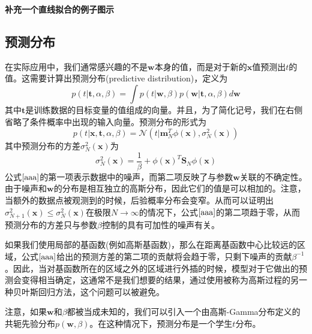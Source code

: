 \textbf{补充一个直线拟合的例子图示}
\subsection*{预测分布}
在实际应用中，我们通常感兴趣的不是$\boldsymbol{w}$本身的值，而是对于新的$\boldsymbol{x}$值预测出$t$的值。这需要计算出预测分布(predictive distribution)，定义为
\begin{equation}
	p(t|\boldsymbol{t},\alpha,\beta)=\int p(t|\boldsymbol{w},\beta)p(\boldsymbol{w}|\boldsymbol{t},\alpha,\beta)d\boldsymbol{w}
\end{equation}
其中$\boldsymbol{t}$是训练数据的目标变量的值组成的向量。并且，为了简化记号，我们在右侧省略了条件概率中出现的输入向量。预测分布的形式为
\begin{equation}
	p(t|\boldsymbol{x},\boldsymbol{t},\alpha,\beta)=\mathcal{N}(t|\boldsymbol{m}^T_N\phi(\boldsymbol{x}),\sigma^2_N(\boldsymbol{x}))
\end{equation}
其中预测分布的方差$\sigma_N^2(\boldsymbol{x})$为
\begin{equation}
\label{aaa}
	\sigma_N^2(\boldsymbol{x})=\frac{1}{\beta}+\phi(\boldsymbol{x})^T\boldsymbol{S}_N\phi(\boldsymbol{x})
\end{equation}
公式$\ref{aaa}$的第一项表示数据中的噪声，而第二项反映了与参数$\boldsymbol{w}$关联的不确定性。由于噪声和$\boldsymbol{w}$的分布是相互独立的高斯分布，因此它们的值是可以相加的。注意，当额外的数据点被观测到的时候，后验概率分布会变窄。从而可以证明出$\sigma^2_{N+1}(\boldsymbol{x})\leqslant \sigma_N^2(\boldsymbol{x})$在极限$N\to \infty$的情况下，公式$\ref{aaa}$的第二项趋于零，从而预测分布的方差只与参数$\beta$控制的具有可加性的噪声有关。

如果我们使用局部的基函数(例如高斯基函数)，那么在距离基函数中心比较远的区域，公式$\ref{aaa}$给出的预测方差的第二项的贡献将会趋于零，只剩下噪声的贡献$\beta^{-1}$。因此，当对基函数所在的区域之外的区域进行外插的时候，模型对于它做出的预测会变得相当确定，这通常不是我们想要的结果，通过使用被称为高斯过程的另一种贝叶斯回归方法，这个问题可以被避免。

注意，如果$\boldsymbol{w}$和$\beta$都被当成未知的，我们可以引入一个由高斯-Gamma分布定义的共轭先验分布$p(\boldsymbol{w},\beta)$。在这种情况下，预测分布是一个学生$t$分布。
